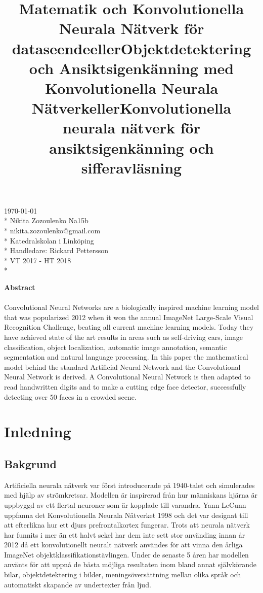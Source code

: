 \documentclass[a4paper,11pt,twoside]{article}
\title{Matematik och Konvolutionella Neurala Nätverk för dataseende}
\title{eller}
\title{Objektdetektering och Ansiktsigenkänning med Konvolutionella Neurala Nätverk}
\title{eller}
\title{Konvolutionella neurala nätverk för ansiktsigenkänning och sifferavläsning}
\date{}
\begin{document}
\maketitle
\vfill

\begin{flushright}
\today \\*
Nikita Zozoulenko Na15b \\*
nikita.zozoulenko@gmail.com \\*
Katedralskolan i Linköping\\*
Handledare: Rickard Pettersson \\*
VT 2017 - HT 2018 \\*
\end{flushright}
\newpage

\Large{\textbf{Abstract}}\\\\
Convolutional Neural Networks are a biologically inspired machine learning model that was popularized 2012 when it won the annual ImageNet Large-Scale Visual Recognition Challenge, beating all current machine learning models. Today they have achieved state of the art results in areas such as self-driving cars, image classification, object localization, automatic image annotation, semantic segmentation and natural language processing. In this paper the mathematical model behind the standard Artificial Neural Network and the Convolutional Neural Network is derived. A Convolutional Neural Network is then adapted to read handwritten digits and to make a cutting edge face detector, successfully detecting over 50 faces in a crowded scene.
\newpage

\tableofcontents

\section{Inledning}

\subsection{Bakgrund}
Artificiella neurala nätverk var först introducerade på 1940-talet och simulerades med hjälp av strömkretsar. Modellen är inspirerad från hur människans hjärna är uppbyggd av ett flertal neuroner som är kopplade till varandra. Yann LeCunn uppfanna det Konvolutionella Neurala Nätverket 1998 och det var designat till att efterlikna hur ett djurs prefrontalkortex fungerar. Trots att neurala nätverk har funnits i mer än ett halvt sekel har dem inte sett stor använding innan år 2012 då ett konvolutionellt neuralt nätverk användes för att vinna den årliga ImageNet objektklassifikationstävlingen. Under de senaste 5 åren har modellen använts för att uppnå de bästa möjliga resultaten inom bland annat självkörande bilar, objektdetektering i bilder, meningsöversättning mellan olika språk och automatiskt skapande av undertexter från ljud. \cite{cs231n}
\end{document}
